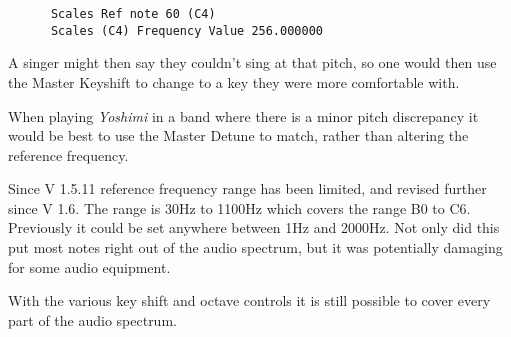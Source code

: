    \begin{verbatim}
      Scales Ref note 60 (C4)
      Scales (C4) Frequency Value 256.000000
   \end{verbatim}

   A singer might then say they couldn't sing at that pitch, so one would then use
   the Master Keyshift to change to a key they were more comfortable with.

   When playing \textsl{Yoshimi} in a band where there is a minor pitch
   discrepancy it would be best to use the Master Detune to match, rather than
   altering the reference frequency.

   Since V 1.5.11 reference frequency range has been limited, and revised further
   since V 1.6. The range is 30Hz to 1100Hz which covers
   the range B0 to C6. Previously it could be set anywhere between 1Hz and 2000Hz.
   Not only did this put most notes right out of the audio spectrum, but it was
   potentially damaging for some audio equipment.

   With the various key shift and octave controls it is still possible to cover
   every part of the audio spectrum.

